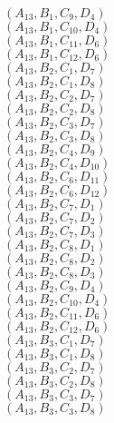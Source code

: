 \documentclass[14pt]{article}
\begin{document}
    $({A}_{13}, {B}_{1}, {C}_{9}, {D}_{4}) $ \\ 
    $({A}_{13}, {B}_{1}, {C}_{10}, {D}_{4}) $ \\ 
    $({A}_{13}, {B}_{1}, {C}_{11}, {D}_{6}) $ \\ 
    $({A}_{13}, {B}_{1}, {C}_{12}, {D}_{6}) $ \\ 
    $({A}_{13}, {B}_{2}, {C}_{1}, {D}_{7}) $ \\ 
    $({A}_{13}, {B}_{2}, {C}_{1}, {D}_{8}) $ \\ 
    $({A}_{13}, {B}_{2}, {C}_{2}, {D}_{7}) $ \\ 
    $({A}_{13}, {B}_{2}, {C}_{2}, {D}_{8}) $ \\ 
    $({A}_{13}, {B}_{2}, {C}_{3}, {D}_{7}) $ \\ 
    $({A}_{13}, {B}_{2}, {C}_{3}, {D}_{8}) $ \\ 
    $({A}_{13}, {B}_{2}, {C}_{4}, {D}_{9}) $ \\ 
    $({A}_{13}, {B}_{2}, {C}_{4}, {D}_{10}) $ \\ 
    $({A}_{13}, {B}_{2}, {C}_{6}, {D}_{11}) $ \\ 
    $({A}_{13}, {B}_{2}, {C}_{6}, {D}_{12}) $ \\ 
    $({A}_{13}, {B}_{2}, {C}_{7}, {D}_{1}) $ \\ 
    $({A}_{13}, {B}_{2}, {C}_{7}, {D}_{2}) $ \\ 
    $({A}_{13}, {B}_{2}, {C}_{7}, {D}_{3}) $ \\ 
    $({A}_{13}, {B}_{2}, {C}_{8}, {D}_{1}) $ \\ 
    $({A}_{13}, {B}_{2}, {C}_{8}, {D}_{2}) $ \\ 
    $({A}_{13}, {B}_{2}, {C}_{8}, {D}_{3}) $ \\ 
    $({A}_{13}, {B}_{2}, {C}_{9}, {D}_{4}) $ \\ 
    $({A}_{13}, {B}_{2}, {C}_{10}, {D}_{4}) $ \\ 
    $({A}_{13}, {B}_{2}, {C}_{11}, {D}_{6}) $ \\ 
    $({A}_{13}, {B}_{2}, {C}_{12}, {D}_{6}) $ \\ 
    $({A}_{13}, {B}_{3}, {C}_{1}, {D}_{7}) $ \\ 
    $({A}_{13}, {B}_{3}, {C}_{1}, {D}_{8}) $ \\ 
    $({A}_{13}, {B}_{3}, {C}_{2}, {D}_{7}) $ \\ 
    $({A}_{13}, {B}_{3}, {C}_{2}, {D}_{8}) $ \\ 
    $({A}_{13}, {B}_{3}, {C}_{3}, {D}_{7}) $ \\ 
    $({A}_{13}, {B}_{3}, {C}_{3}, {D}_{8}) $ \\ 
\end{document}
